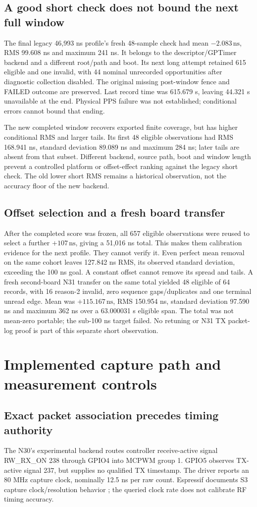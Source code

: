 \documentclass[10pt,letterpaper]{article}
\newcommand{\ns}{\,\mathrm{ns}}\newcommand{\us}{\,\mu\mathrm{s}}\newcommand{\code}[1]{\texttt{#1}}\newcolumntype{L}[1]{>{\RaggedRight\arraybackslash}p{#1}}\renewcommand{\arraystretch}{1.15}
\newcommand{\FinalResults}{A fresh second-board N31 transfer on the same total yielded 48 eligible of 64 records, with 16 reason-2 invalid, zero sequence gaps/duplicates and one terminal unread edge. Mean was $+115.167\ns$, RMS 150.954 ns, standard deviation 97.590 ns and maximum 362 ns over a 63.000031 s eligible span. The total was not mean-zero portable; the sub-100 ns target failed. No retuning or N31 TX packet-log proof is part of this separate short observation.}
\begin{document}
\subsection{A good short check does not bound the next full window}
The final legacy 46,993 ns profile's fresh 48-sample check had mean $-2.083\ns$, RMS 99.608 ns and maximum 241 ns. It belongs to the descriptor/GPTimer backend and a different root/path and boot. Its next long attempt retained 615 eligible and one invalid, with 44 nominal unrecorded opportunities after diagnostic collection disabled. The original missing post-window fence and FAILED outcome are preserved. Last record time was 615.679 s, leaving 44.321 s unavailable at the end. Physical PPS failure was not established; conditional errors cannot bound that ending.

The new completed window recovers exported finite coverage, but has higher conditional RMS and larger tails. Its first 48 eligible observations had RMS 168.941 ns, standard deviation 89.089 ns and maximum 284 ns; later tails are absent from that subset. Different backend, source path, boot and window length prevent a controlled platform or offset-effect ranking against the legacy short check. The old lower short RMS remains a historical observation, not the accuracy floor of the new backend.

\subsection{Offset selection and a fresh board transfer}
After the completed score was frozen, all 657 eligible observations were reused to select a further $+107\ns$, giving a 51,016 ns total. This makes them calibration evidence for the next profile. They cannot verify it. Even perfect mean removal on the same cohort leaves 127.842 ns RMS, its observed standard deviation, exceeding the 100 ns goal. A constant offset cannot remove its spread and tails. \FinalResults{}
\newpage

\section{Implemented capture path and measurement controls}\label{sec:method}
\subsection{Exact packet association precedes timing authority}
The N30's experimental backend routes controller receive-active signal RW\_RX\_ON 238 through GPIO4 into MCPWM group 1. GPIO5 observes TX-active signal 237, but supplies no qualified TX timestamp. The driver reports an 80 MHz capture clock, nominally 12.5 ns per raw count. Espressif documents S3 capture clock/resolution behavior \cite{mcpwm}; the queried clock rate does not calibrate RF timing accuracy.
\end{document}

